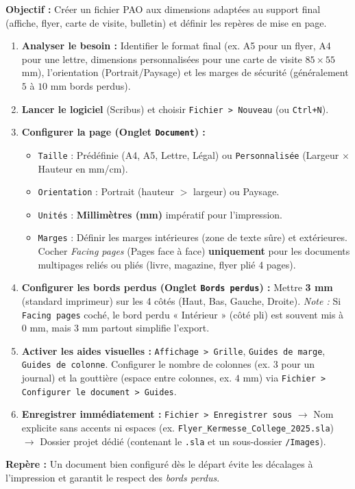 \documentclass[11pt]{article}
\begin{document}
\begin{methode}
    \textbf{Objectif :} Créer un fichier PAO aux dimensions adaptées au support final (affiche, flyer, carte de visite, bulletin) et définir les repères de mise en page.
    \begin{enumerate}
        \item \textbf{Analyser le besoin :} Identifier le format final (ex. A5 pour un flyer, A4 pour une lettre, dimensions personnalisées pour une carte de visite $85 \times 55$ mm), l'orientation (Portrait/Paysage) et les marges de sécurité (généralement $5$ à $10$ mm bords perdus).
        \item \textbf{Lancer le logiciel} (Scribus) et choisir \texttt{Fichier > Nouveau} (ou \texttt{Ctrl+N}).
        \item \textbf{Configurer la page (Onglet \texttt{Document}) :}
              \begin{itemize}
                  \item \texttt{Taille} : Prédéfinie (A4, A5, Lettre, Légal) ou \texttt{Personnalisée} (Largeur $\times$ Hauteur en mm/cm).
                  \item \texttt{Orientation} : Portrait (hauteur $>$ largeur) ou Paysage.
                  \item \texttt{Unités} : \textbf{Millimètres (mm)} impératif pour l'impression.
                  \item \texttt{Marges} : Définir les marges intérieures (zone de texte sûre) et extérieures. Cocher \emph{Facing pages} (Pages face à face) \textbf{uniquement} pour les documents multipages reliés ou pliés (livre, magazine, flyer plié 4 pages).
              \end{itemize}
        \item \textbf{Configurer les bords perdus (Onglet \texttt{Bords perdus}) :} Mettre \textbf{3 mm} (standard imprimeur) sur les 4 côtés (Haut, Bas, Gauche, Droite). \emph{Note :} Si \texttt{Facing pages} coché, le bord perdu « Intérieur » (côté pli) est souvent mis à 0 mm, mais 3 mm partout simplifie l'export.
        \item \textbf{Activer les aides visuelles :} \texttt{Affichage > Grille}, \texttt{Guides de marge}, \texttt{Guides de colonne}. Configurer le nombre de colonnes (ex. $3$ pour un journal) et la gouttière (espace entre colonnes, ex. $4$ mm) via \texttt{Fichier > Configurer le document > Guides}.
        \item \textbf{Enregistrer immédiatement :} \texttt{Fichier > Enregistrer sous} $\rightarrow$ Nom explicite sans accents ni espaces (ex. \texttt{Flyer\_Kermesse\_College\_2025.sla}) $\rightarrow$ Dossier projet dédié (contenant le \texttt{.sla} et un sous-dossier \texttt{/Images}).
    \end{enumerate}
    \textbf{Repère :} Un document bien configuré dès le départ évite les décalages à l'impression et garantit le respect des \emph{bords perdus}.
\end{methode}
\end{document}
